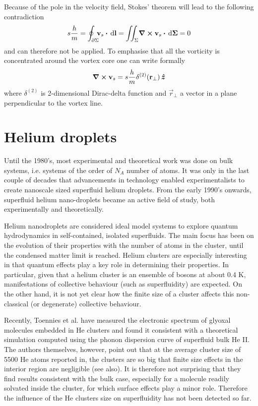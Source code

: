 			Because of the pole in the velocity field, Stokes' theorem will lead to the following contradiction
			\begin{align}
				s\frac{h}{m}=\oint_{\partial\Sigma}\!\!\!\vec{v}_s\vdot\unit{d}\vec{l} = \iint_{\Sigma}\!\curl{\vec{v}_s}\vdot\unit{d}\vec{\Sigma} = 0
			\end{align}
			and can therefore not be applied. To emphasise that all the vorticity is concentrated around the vortex core one can write formally
			\begin{align}
				\curl{\bm{\mathrm{v}}_s} = s\frac{h}{m}\delta^{(2)}(\bm{\mathrm{r}}_\perp)\,\vu*{z}
			\end{align}
			where $\delta^{(2)}$ is 2-dimensional Dirac-delta function and $\vec{r}_\perp$ a vector in a plane perpendicular to the vortex line.

	\section{Helium droplets}\label{sec:helium-droplets}
		Until the 1980's, most experimental and theoretical work was done on bulk systems, i.e. systems of the order of $N_A$ number of atoms. It was only in the last couple of decades that advancements in technology enabled experimentalists to create nanoscale sized superfluid helium droplets. From the early 1990's onwards, superfluid helium nano-droplets became an active field of study, both experimentally and theoretically. 
		
		Helium nanodroplets are considered ideal model systems to explore quantum hydrodynamics in self-contained, isolated superfluids. The main focus has been on the evolution of their properties with the number of atoms in the cluster, until the condensed matter limit is reached. Helium clusters are especially interesting in that quantum effects play a key role in determining their properties. In particular, given that a helium cluster is an ensemble of bosons at about 0.4 K\citep{Brink1990,Hartmann1995}, manifestations of collective behaviour (such as superfluidity) are expected. On the other hand, it is not yet clear how the finite size of a cluster affects this non-classical (or degenerate) collective behaviour.

		Recently, Toennies et al.\citep{Hartmann1996} have measured the electronic spectrum of glyoxal molecules embedded in He clusters and found it consistent with a theoretical simulation computed using the phonon dispersion curve of superfluid bulk He II. The authors themselves, however, point out that at the average cluster size of 5500 He atoms reported in, the clusters are so big that finite size effects in the interior region are negligible (see also). It is therefore not surprising that they find results consistent with the bulk case, especially for a molecule readily solvated inside the cluster, for which surface effects play a minor role. Therefore the influence of the He clusters size on superfluidity has not been detected so far.
		
